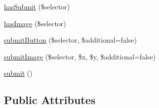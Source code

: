 \begin{DoxyCompactItemize}
\item 
\hyperlink{class_simple_form_a7f285ab460c412548f0bded947b9cbf5}{hasSubmit} (\$selector)
\item 
\hyperlink{class_simple_form_aca30d699b068184b79b365dd05dce9a5}{hasImage} (\$selector)
\item 
\hyperlink{class_simple_form_a335273f023ff494045ab6d82072a5d9f}{submitButton} (\$selector, \$additional=false)
\item 
\hyperlink{class_simple_form_a3070b07ce5bd0464ad0939acacc24045}{submitImage} (\$selector, \$x, \$y, \$additional=false)
\item 
\hyperlink{class_simple_form_a6d59ba8fe87af0d7873fbf38e36c9157}{submit} ()
\end{DoxyCompactItemize}
\subsection*{Public Attributes}
